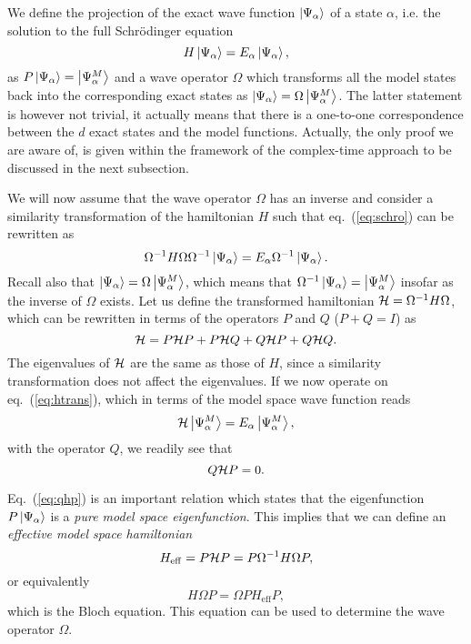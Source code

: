 We define the projection of the exact wave function $\left| \Psi_{\alpha} \right\rangle$
of a state $\alpha$, i.e. the solution to the full
Schr\"{o}dinger equation
\begin{equation}
   H\left| \Psi_{\alpha} \right\rangle =E_{\alpha}\left| \Psi_{\alpha} \right\rangle,
   \label{eq:schro}
\end{equation}
as $P\left| \Psi_{\alpha} \right\rangle=\left| \Psi_{\alpha}^M \right\rangle$ and a wave operator $\Omega$
which transforms all the model states back into the corresponding
exact states as $\left| \Psi_{\alpha} \right\rangle=\Omega\left| \Psi_{\alpha}^M \right\rangle$.  The latter
statement is however not trivial, it actually means that there is
a one-to-one correspondence between  the $d$ exact states and the
model functions. Actually, the only proof we are aware of, is given
within the framework of the complex-time approach to be discussed
in the next subsection.


We will now assume that the wave operator $\Omega$ has an inverse and
consider a similarity transformation of the hamiltonian $H$ such that
eq.\ (\ref{eq:schro}) can be rewritten as
\begin{equation}
   \Omega^{-1}H\Omega\Omega^{-1}\left| \Psi_{\alpha} \right\rangle = 
    E_{\alpha}\Omega^{-1}\left| \Psi_{\alpha} \right\rangle.
   \label{eq:htrans}
\end{equation}
Recall also that $\left| \Psi_{\alpha} \right\rangle= 
\Omega\left| \Psi_{\alpha}^{M} \right\rangle$, which means that
 $\Omega^{-1}\left| \Psi_{\alpha} \right\rangle = \left| \Psi_{\alpha}^{M} \right\rangle$ insofar as the inverse of
 $\Omega$ exists. Let us define the transformed hamiltonian ${\cal H}
 =\Omega^{-1}H\Omega$, which can be rewritten in terms of the
operators $P$ and $Q$ ($P+Q=I$) as
\begin{equation}
  {\cal H}=P{\cal H}P+P{\cal H}Q+Q{\cal H}P+Q{\cal H}Q.
\end{equation}
The eigenvalues of ${\cal H}$ are the same as those of $H$, since a
similarity transformation does not affect the eigenvalues.
If we now operate  on eq.\ (\ref{eq:htrans}), which in terms of the model
space wave function reads
\begin{equation}
  {\cal H}\left| \Psi_{\alpha}^{M} \right\rangle = E_{\alpha}\left| \Psi_{\alpha}^{M} \right\rangle,
\end{equation}
with the operator $Q$, we readily see that
\begin{equation}
   Q{\cal H}P=0.\label{eq:qhp}
\end{equation}

Eq.\ (\ref{eq:qhp}) is an important relation which states that the eigenfunction
$P\left| \Psi_{\alpha} \right\rangle$ is a {\em pure model space eigenfunction}. This implies that
we can define an {\em effective model space hamiltonian}
\begin{equation}
  H_{\mathrm{eff}}=P{\cal H}P = P\Omega^{-1} H \Omega P,
\end{equation}
or equivalently
\begin{equation}
   H\Omega P=\Omega PH_{\mathrm{eff}}P,
  \label{eq:bloch}
\end{equation}
which is the Bloch \cite{bloch59} equation. This equation can
be used to determine the wave operator $\Omega$.

